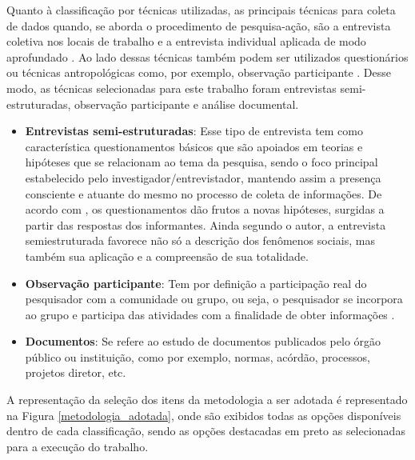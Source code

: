 Quanto à classificação por técnicas utilizadas, as principais técnicas para coleta de dados quando, se aborda o procedimento de pesquisa-ação, são a entrevista coletiva nos locais de trabalho e a entrevista individual aplicada de modo aprofundado \cite{thiollent2011metodologia}. Ao lado dessas técnicas também podem ser utilizados questionários ou técnicas antropológicas como, por exemplo, observação participante \cite{thiollent2011metodologia}. Desse modo, as técnicas selecionadas para este trabalho foram entrevistas semi-estruturadas, observação participante e análise documental.

\begin{itemize}
	\item \textbf{Entrevistas semi-estruturadas}: Esse tipo de entrevista tem  como  característica questionamentos básicos que são apoiados em teorias e hipóteses que se relacionam ao tema da pesquisa, sendo o foco principal estabelecido pelo investigador/entrevistador, mantendo assim a presença consciente e atuante do mesmo no processo de coleta de informações. De acordo com , os questionamentos dão frutos a novas hipóteses, surgidas a partir das respostas dos informantes. Ainda segundo o autor, a entrevista semiestruturada favorece não só a descrição dos fenômenos sociais, mas também sua aplicação e a compreensão de sua totalidade.
	\item \textbf{Observação participante}: Tem por definição a participação real do pesquisador com a comunidade ou grupo, ou seja, o pesquisador se incorpora ao grupo e participa das atividades com a finalidade de obter informações \cite{marconi2010fundamentos}.
	\item \textbf{Documentos}: Se refere ao estudo de documentos publicados pelo órgão público ou instituição, como por exemplo, normas, acórdão, processos, projetos diretor, etc.
\end{itemize}

A representação da seleção dos itens da metodologia a ser adotada é representado na Figura \ref{metodologia_adotada}, onde são exibidos todas as opções disponíveis dentro de cada classificação, sendo as opções destacadas em preto as selecionadas para a execução do trabalho.

